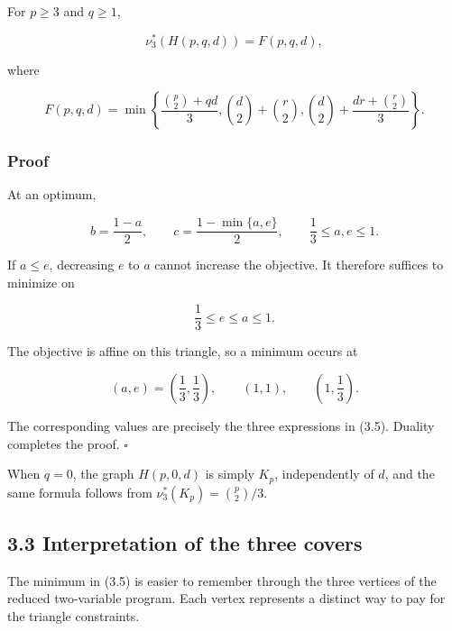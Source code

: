\documentclass[
  american,
  11pt,
  a4paper,
]{article}
\begin{document}
For \(p\ge3\) and \(q\ge1\),

\[
\boxed{
\nu_3^*(H(p,q,d))
=
F(p,q,d),
}
\tag{3.4}
\]

where

\[
\boxed{
F(p,q,d)
=
\min\left\{
\frac{\binom p2+qd}{3},
\binom d2+\binom r2,
\binom d2+\frac{dr+\binom r2}{3}
\right\}.
}
\tag{3.5}
\]

\subsubsection{Proof}\label{proof}

At an optimum,

\[
b=\frac{1-a}{2},
\qquad
c=\frac{1-\min\{a,e\}}2,
\qquad
\frac13\le a,e\le1.
\]

If \(a\le e\), decreasing \(e\) to \(a\) cannot increase the objective. It therefore suffices to minimize on

\[
\frac13\le e\le a\le1.
\]

The objective is affine on this triangle, so a minimum occurs at

\[
(a,e)=\left(\frac13,\frac13\right),
\qquad
(1,1),
\qquad
\left(1,\frac13\right).
\]

The corresponding values are precisely the three expressions in (3.5). Duality completes the proof. \(\square\)

When \(q=0\), the graph \(H(p,0,d)\) is simply \(K_p\), independently of \(d\), and the same formula follows from \(\nu_3^*(K_p)=\binom p2/3\).

\subsection{3.3 Interpretation of the three covers}\label{interpretation-of-the-three-covers}

The minimum in (3.5) is easier to remember through the three vertices of the reduced two-variable program. Each vertex represents a distinct way to pay for the triangle constraints.
\end{document}
